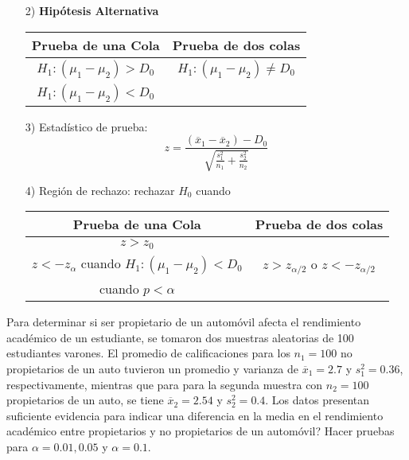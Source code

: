 \begin{frame}
\begin{frame}
\begin{itemize}
donde $D_{0}$ es el valor, la diferencia, espec\'ifico que se desea probar. En algunos casos se querr\'a demostrar que no hay diferencia alguna, es decir $D_{0}=0$.

\item[2) ] \textbf{Hip\'otesis Alternativa}
\begin{tabular}{cc}\hline
\textbf{Prueba de una Cola} & \textbf{Prueba de dos colas}\\\hline
$H_{1}:\left(\mu_{1}-\mu_{2}\right)>D_{0}$ & $H_{1}:\left(\mu_{1}-\mu_{2}\right)\neq D_{0}$\\ 
$H_{1}:\left(\mu_{1}-\mu_{2}\right)<D_{0}$&\\
\end{tabular}

\end{itemize}




\begin{itemize}
\item[3) ] Estad\'istico de prueba:
$$z=\frac{\left(\overline{x}_{1}-\overline{x}_{2}\right)-D_{0}}{\sqrt{\frac{s^{2}_{1}}{n_{1}}+\frac{s^{2}_{2}}{n_{2}}}}$$
\item[4) ] Regi\'on de rechazo: rechazar $H_{0}$ cuando
\begin{tabular}{cc}\hline
\textbf{Prueba de una Cola} & \textbf{Prueba de dos colas}\\\hline
$z>z_{0}$ & \\
$z<-z_{\alpha}$ cuando $H_{1}:\left(\mu_{1}-\mu_{2}\right)<D_{0}$&$z>z_{\alpha/2}$ o $z<-z_{\alpha/2}$\\
 cuando $p<\alpha$&\\
\end{tabular}


\end{itemize}





\begin{Ejem}
Para determinar si ser propietario de un autom\'ovil afecta el rendimiento acad\'emico de un estudiante, se tomaron dos muestras aleatorias de 100 estudiantes varones. El promedio de calificaciones para los $n_{1}=100$ no propietarios de un auto tuvieron un promedio y varianza de $\overline{x}_{1}=2.7$ y $s_{1}^{2}=0.36$, respectivamente, mientras que para para la segunda muestra con $n_{2}=100$ propietarios de un auto, se tiene $\overline{x}_{2}=2.54$ y $s_{2}^{2}=0.4$. Los datos presentan suficiente evidencia para indicar una diferencia en la media en el rendimiento acad\'emico entre propietarios y no propietarios de un autom\'ovil? Hacer pruebas para $\alpha=0.01,0.05$ y $\alpha=0.1$.
\end{Ejem}


\end{frame}
\end{frame}
